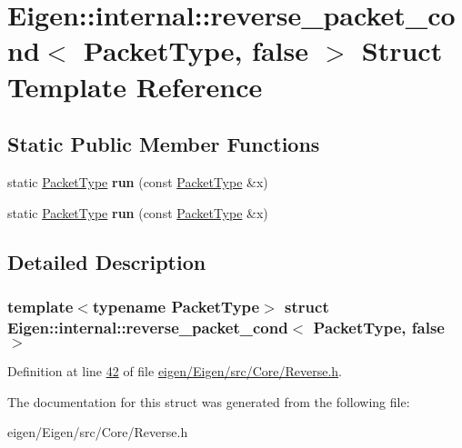 \hypertarget{struct_eigen_1_1internal_1_1reverse__packet__cond_3_01_packet_type_00_01false_01_4}{}\section{Eigen\+:\+:internal\+:\+:reverse\+\_\+packet\+\_\+cond$<$ Packet\+Type, false $>$ Struct Template Reference}
\label{struct_eigen_1_1internal_1_1reverse__packet__cond_3_01_packet_type_00_01false_01_4}
\subsection*{Static Public Member Functions}
\begin{DoxyCompactItemize}
\item 
\mbox{\label{struct_eigen_1_1internal_1_1reverse__packet__cond_3_01_packet_type_00_01false_01_4_ac5e8467665d9f809e5c217bfaeeb259d}} 
static \hyperlink{struct_eigen_1_1_packet_type}{Packet\+Type} {\bfseries run} (const \hyperlink{struct_eigen_1_1_packet_type}{Packet\+Type} \&x)
\item 
\mbox{\label{struct_eigen_1_1internal_1_1reverse__packet__cond_3_01_packet_type_00_01false_01_4_ac5e8467665d9f809e5c217bfaeeb259d}} 
static \hyperlink{struct_eigen_1_1_packet_type}{Packet\+Type} {\bfseries run} (const \hyperlink{struct_eigen_1_1_packet_type}{Packet\+Type} \&x)
\end{DoxyCompactItemize}


\subsection{Detailed Description}
\subsubsection*{template$<$typename Packet\+Type$>$\newline
struct Eigen\+::internal\+::reverse\+\_\+packet\+\_\+cond$<$ Packet\+Type, false $>$}



Definition at line \hyperlink{eigen_2_eigen_2src_2_core_2_reverse_8h_source_l00042}{42} of file \hyperlink{eigen_2_eigen_2src_2_core_2_reverse_8h_source}{eigen/\+Eigen/src/\+Core/\+Reverse.\+h}.



The documentation for this struct was generated from the following file\+:\begin{DoxyCompactItemize}
\item 
eigen/\+Eigen/src/\+Core/\+Reverse.\+h\end{DoxyCompactItemize}
